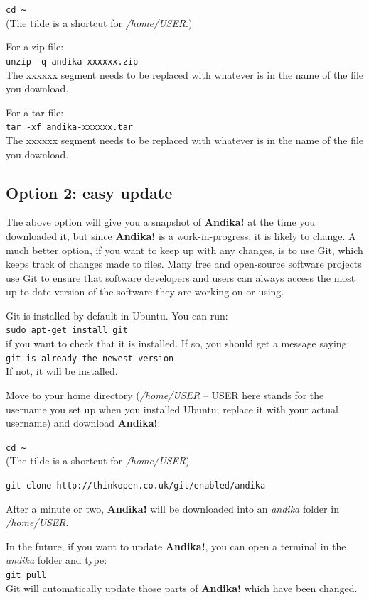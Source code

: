 \verb|cd ~|\\
(The tilde is a shortcut for \textit{/home/USER}.)

For a zip file:\\
\verb|unzip -q andika-xxxxxx.zip|\\
The xxxxxx segment needs to be replaced with whatever is in the name of the file you download.

For a tar file:\\
\verb|tar -xf andika-xxxxxx.tar|\\
The xxxxxx segment needs to be replaced with whatever is in the name of the file you download.

\subsection{Option 2: easy update}
\label{s:gitclone}

The above option will give you a snapshot of \textbf{Andika!} at the time you downloaded it, but since \textbf{Andika!} is a work-in-progress, it is likely to change.  A much better option, if you want to keep up with any changes, is to use Git, which keeps track of changes made to files.  Many free and open-source software projects use Git to ensure that software developers and users can always access the most up-to-date version of the software they are working on or using.

Git is installed by default in Ubuntu.  You can run:\\
\verb|sudo apt-get install git|\\
if you want to check that it is installed.  If so, you should get a message saying:\\
\verb|git is already the newest version|\\
If not, it will be installed.

Move to your home directory (\textit{/home/USER} -- USER here stands for the username you set up when you installed Ubuntu; replace it with your actual username) and download \textbf{Andika!}:

\verb|cd ~|\\
(The tilde is a shortcut for \textit{/home/USER})

\verb|git clone http://thinkopen.co.uk/git/enabled/andika|

After a minute or two, \textbf{Andika!} will be downloaded into an \textit{andika} folder in \textit{/home/USER}.

In the future, if you want to update \textbf{Andika!}, you can open a terminal in the \textit{andika} folder and type:\\
\verb|git pull|\\
Git will automatically update those parts of \textbf{Andika!} which have been changed.

